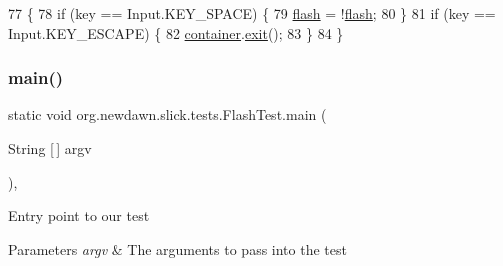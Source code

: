 \begin{DoxyCode}
77                                             \{
78         \textcolor{keywordflow}{if} (key == Input.KEY\_SPACE) \{
79             \mbox{\hyperlink{classorg_1_1newdawn_1_1slick_1_1tests_1_1_flash_test_a190c127d700a8eb39c86d39f26b83d7f}{flash}} = !\mbox{\hyperlink{classorg_1_1newdawn_1_1slick_1_1tests_1_1_flash_test_a190c127d700a8eb39c86d39f26b83d7f}{flash}};
80         \}
81         \textcolor{keywordflow}{if} (key == Input.KEY\_ESCAPE) \{
82             \mbox{\hyperlink{classorg_1_1newdawn_1_1slick_1_1tests_1_1_flash_test_ad78e2796710293c14d8913b36a8e9e01}{container}}.\mbox{\hyperlink{classorg_1_1newdawn_1_1slick_1_1_game_container_a6d888463695fe3aac4123e72ac14480f}{exit}}();
83         \}
84     \}
\end{DoxyCode}
\mbox{\label{classorg_1_1newdawn_1_1slick_1_1tests_1_1_flash_test_a4e0a5cdc10420a47c2d3faee14a2fa1f}} 
\subsubsection{\texorpdfstring{main()}{main()}}
{\footnotesize\ttfamily static void org.\+newdawn.\+slick.\+tests.\+Flash\+Test.\+main (\begin{DoxyParamCaption}\item[{String \mbox{[}$\,$\mbox{]}}]{argv }\end{DoxyParamCaption})\hspace{0.3cm}{\ttfamily [inline]}, {\ttfamily [static]}}

Entry point to our test


\begin{DoxyParams}{Parameters}
{\em argv} & The arguments to pass into the test \\
\hline
\end{DoxyParams}

